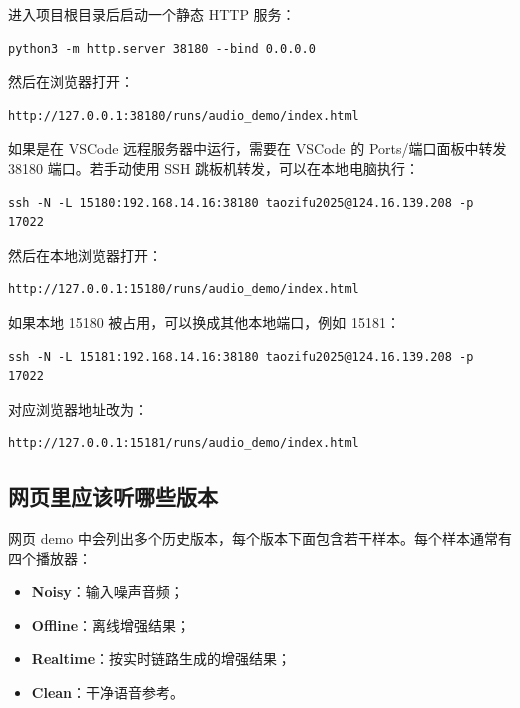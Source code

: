 \documentclass[UTF8,12pt,a4paper]{ctexart}
\begin{document}
进入项目根目录后启动一个静态 HTTP 服务：

\begin{lstlisting}
python3 -m http.server 38180 --bind 0.0.0.0
\end{lstlisting}

然后在浏览器打开：

\begin{lstlisting}
http://127.0.0.1:38180/runs/audio_demo/index.html
\end{lstlisting}

如果是在 VSCode 远程服务器中运行，需要在 VSCode 的 Ports/端口面板中转发 38180 端口。若手动使用 SSH 跳板机转发，可以在本地电脑执行：

\begin{lstlisting}
ssh -N -L 15180:192.168.14.16:38180 taozifu2025@124.16.139.208 -p 17022
\end{lstlisting}

然后在本地浏览器打开：

\begin{lstlisting}
http://127.0.0.1:15180/runs/audio_demo/index.html
\end{lstlisting}

如果本地 15180 被占用，可以换成其他本地端口，例如 15181：

\begin{lstlisting}
ssh -N -L 15181:192.168.14.16:38180 taozifu2025@124.16.139.208 -p 17022
\end{lstlisting}

对应浏览器地址改为：

\begin{lstlisting}
http://127.0.0.1:15181/runs/audio_demo/index.html
\end{lstlisting}

\subsection{网页里应该听哪些版本}

网页 demo 中会列出多个历史版本，每个版本下面包含若干样本。每个样本通常有四个播放器：

\begin{itemize}
  \item \textbf{Noisy}：输入噪声音频；
  \item \textbf{Offline}：离线增强结果；
  \item \textbf{Realtime}：按实时链路生成的增强结果；
  \item \textbf{Clean}：干净语音参考。
\end{itemize}
\end{document}

